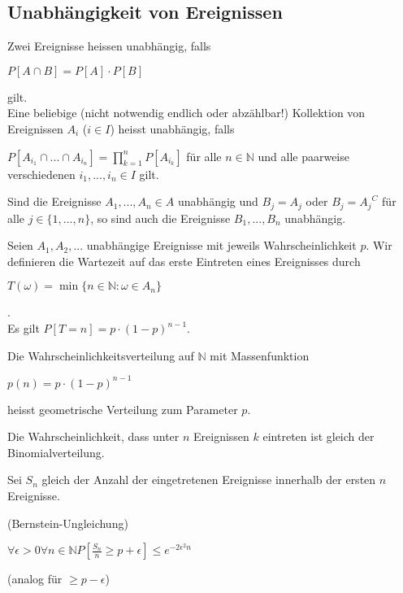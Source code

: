 \subsection{Unabhängigkeit von Ereignissen}

\begin{definition}
Zwei Ereignisse heissen unabhängig, falls 
\begin{center}
$P[A \cap B]=P[A] \cdot P[B]$
\end{center}
gilt. \\
Eine beliebige (nicht notwendig endlich oder abzählbar!) Kollektion von Ereignissen $A_i$ ($i \in I$) heisst unabhängig, falls 
\begin{center}
$P[A_{i_1} \cap ... \cap A_{i_n}]= \prod_{k=1}^n P[A_{i_k}]$ für alle $n \in \mathbb{N}$ und alle paarweise verschiedenen $i_1, ... , i_n \in I$ gilt.
\end{center}
\end{definition}

\begin{satz}
Sind die Ereignisse $A_1, ... , A_n \in A$ unabhängig und $B_j=A_j$ oder $B_j={A_j}^C$ für alle $j \in \{1, ... , n\}$, so sind auch die Ereignisse $B_1, ... , B_n$ unabhängig.
\end{satz}

Seien $A_1, A_2, ...$ unabhängige Ereignisse mit jeweils Wahrscheinlichkeit $p$.  Wir definieren die Wartezeit auf das erste Eintreten eines Ereignisses durch
\begin{center}
$T(\omega)=\min \{n \in \mathbb{N} : \omega \in A_n \}$
\end{center}
. \\
Es gilt $P[T=n]=p \cdot (1-p)^{n-1}$.

\begin{definition}
Die Wahrscheinlichkeitsverteilung auf $\mathbb{N}$ mit Massenfunktion 
\begin{center}
$p(n)=p \cdot (1-p)^{n-1}$
\end{center}
heisst geometrische Verteilung zum Parameter $p$.
\end{definition}

Die Wahrscheinlichkeit, dass unter $n$ Ereignissen $k$ eintreten ist gleich der Binomialverteilung.

Sei $S_n$ gleich der Anzahl der eingetretenen Ereignisse innerhalb der ersten $n$ Ereignisse.
\begin{satz}
(Bernstein-Ungleichung) \\
\begin{center}
$\forall \epsilon > 0 \forall n \in \mathbb{N} P[\frac{S_n}{n} \geq p + \epsilon] \leq e^{-2 \epsilon^2 n}$
\end{center}
(analog für $\geq p - \epsilon$)
\end{satz}

